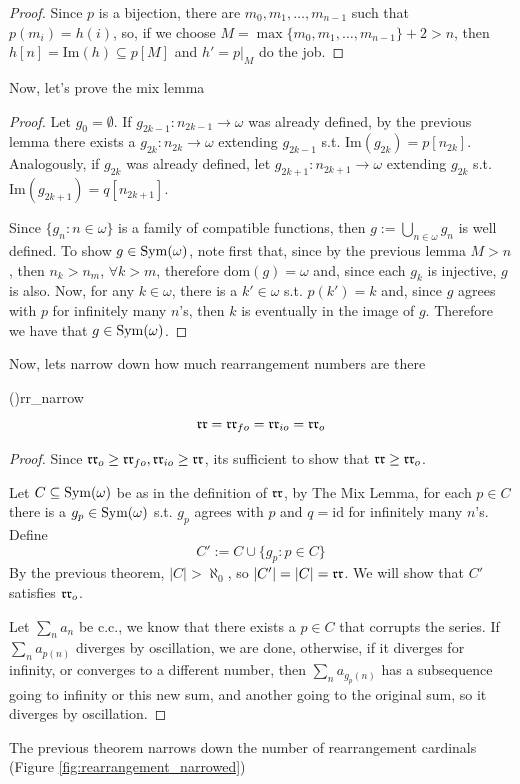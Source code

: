 \begin{proof}
    Since $p$ is a bijection, there are $m_0,m_1,\dots,m_{n-1}$ such that $p(m_i)=h(i)$, so, if we choose $M=\max\{m_0,m_1,\dots,m_{n-1}\}+2>n$, then $h[n]=\text{Im}(h)\subseteq p[M]$ and $h'=p\lvert_M$ do the job.
\end{proof}

Now, let's prove the mix lemma

\begin{proof} Let $g_0=\emptyset$. If $g_{2k-1}:n_{2k-1}\to\omega$ was already defined, by the previous lemma there exists a $g_{2k}:n_{2k}\to\omega$ extending $g_{2k-1}$ s.t. $\text{Im}(g_{2k})=p[n_{2k}]$. Analogously, if $g_{2k}$ was already defined, let $g_{2k+1}:n_{2k+1}\to\omega$ extending $g_{2k}$ s.t. $\text{Im}(g_{2k+1})=q[n_{2k+1}]$.

Since $\{g_n:n\in\omega\}$ is a family of compatible functions, then $g:=\bigcup_{n\in\omega}g_n$ is well defined. To show $g\in\mathrm{Sym}(\omega)$, note first that, since by the previous lemma $M>n$, then $n_k>n_m$, $\forall k>m$, therefore $\text{dom}(g)=\omega$ and, since each $g_k$ is injective, $g$ is also. Now, for any $k\in\omega$, there is a $k'\in\omega$ s.t. $p(k')=k$ and, since $g$ agrees with $p$ for infinitely many $n$'s, then $k$ is eventually in the image of $g$. Therefore we have that $g\in\mathrm{Sym}(\omega)$.
\end{proof}

Now, lets narrow down how much rearrangement numbers are there

\begin{theorem}{(\cite{blass})}{rr_narrow}
    $$\mathfrak{rr}=\mathfrak{rr}_{fo}=\mathfrak{rr}_{io}=\mathfrak{rr}_o$$
\end{theorem}

\begin{proof}
    Since $\mathfrak{rr}_o\geq\mathfrak{rr}_{fo},\mathfrak{rr}_{io}\geq\mathfrak{rr}$, its sufficient to show that $\mathfrak{rr}\geq\mathfrak{rr}_o$.

    Let $C\subseteq\mathrm{Sym}(\omega)$ be as in the definition of $\mathfrak{rr}$, by The Mix Lemma, for each $p\in C$ there is a $g_p\in\mathrm{Sym}(\omega)$ s.t. $g_p$ agrees with $p$ and $q=\text{id}$ for infinitely many $n$'s. Define
    $$C':=C\cup\{g_p:p\in C\}$$
    By the previous theorem, $\lvert C\rvert>\aleph_0$, so $\lvert C'\rvert=\lvert C\rvert=\mathfrak{rr}$. We will show that $C'$ satisfies $\mathfrak{rr}_o$.

    Let $\sum_n a_n$ be c.c., we know that there exists a $p\in C$ that corrupts the series. If $\sum_n a_{p(n)}$ diverges by oscillation, we are done, otherwise, if it diverges for infinity, or converges to a different number, then $\sum_n a_{g_p(n)}$ has a subsequence going to infinity or this new sum, and another going to the original sum, so it diverges by oscillation.
\end{proof}
The previous theorem narrows down the number of rearrangement cardinals (Figure \cref{fig:rearrangement_narrowed})

